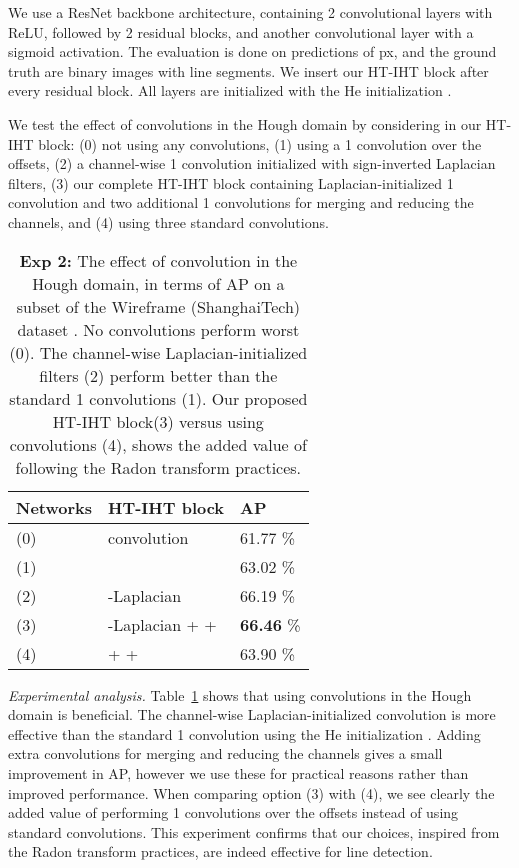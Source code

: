 \documentclass[runningheads]{llncs}
\newcommand{\model}{HT-IHT block\xspace}
\begin{document}
We use a ResNet \cite{he2016deep} backbone architecture, containing 2 convolutional layers with ReLU, followed by 2 residual blocks, and another convolutional layer with a sigmoid activation. The evaluation is done on predictions of  px, and the ground truth are binary images with line segments.
We insert our \model after every residual block. 
All layers are initialized with the He initialization \cite{he2015delving}. 

We test the effect of convolutions in the Hough domain by considering in our \model:
(0) not using any convolutions, 
(1) using a 1 convolution over the offsets,
(2) a channel-wise 1 convolution initialized with sign-inverted Laplacian filters,
(3) our complete \model containing Laplacian-initialized 1 convolution and two additional 1 convolutions for merging and reducing the channels, and
(4) using three standard  convolutions.\\

\begin{table}[t!]
    \centering
    \begin{tabular}{l@{\hskip 0.2in}l@{\hskip 0.4in}l}
             \toprule
           Networks & \model     & AP \\ \midrule
           (0) &  convolution                                    & 61.77 \% \\
           (1) &                                          & 63.02 \% \\
           (2) & -Laplacian                               & 66.19 \% \\
           (3) & -Laplacian +  +  & \textbf{66.46} \% \\
           (4) & +  +             & 63.90 \%  \\
           \bottomrule
        \end{tabular} 
    \caption{\textbf{Exp 2:} The effect of convolution in the Hough domain, in terms of AP on a subset of the Wireframe (ShanghaiTech) dataset \cite{huang2018learning}.
    No convolutions perform worst (0). 
    The channel-wise Laplacian-initialized filters (2) perform better than the standard 1 convolutions (1). 
    Our proposed \model (3) versus using  convolutions (4), shows the added value of following the Radon transform practices.}
    \label{tab:exp2}
\end{table}

\noindent\emph{Experimental analysis.} 
Table~\ref{tab:exp2} shows that using convolutions in the Hough domain is beneficial. 
The channel-wise Laplacian-initialized convolution is more effective than the standard 1 convolution using the He initialization \cite{he2015delving}. 
Adding extra convolutions for merging and reducing the channels gives a small improvement in AP, however we use these for practical reasons rather than improved performance. 
When comparing option (3) with (4), we see clearly the added value of performing 1 convolutions over the offsets instead of using standard  convolutions. 
This experiment confirms that our choices, inspired from the Radon transform practices, are indeed effective for line detection.
\end{document}
